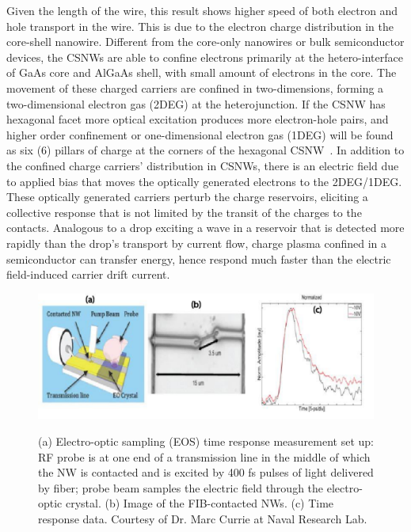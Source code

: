 Given the length of the wire, this result shows higher speed of both electron
and hole transport in the wire. This is due to the electron charge distribution
in the core-shell nanowire. Different from the core-only nanowires or bulk
semiconductor devices, the CSNWs are able to confine electrons primarily at the
hetero-interface of GaAs core and AlGaAs shell, with small amount of electrons
in the core. The movement of these charged carriers are confined in
two-dimensions, forming a two-dimensional electron gas (2DEG) at the
heterojunction. If the CSNW has hexagonal facet more optical excitation
produces more electron-hole pairs, and higher order confinement or
one-dimensional electron gas (1DEG) will be found as six (6) pillars of charge
at the corners of the hexagonal CSNW~\cite{Wang:2015hz}. In addition to the
confined charge carriers' distribution in CSNWs, there is an electric field due
to applied bias that moves the optically generated electrons to the 2DEG/1DEG.
These optically generated carriers perturb the charge reservoirs, eliciting a
collective response that is not limited by the transit of the charges to the
contacts. Analogous to a drop exciting a wave in a reservoir that is detected
more rapidly than the drop's transport by current flow, charge plasma confined
in a semiconductor can transfer energy, hence respond much faster than the
electric field-induced carrier drift current.

\begin{figure}
  \caption[Electro-optic sampling (EOS) time response measurement set up and results.]{(a) Electro-optic sampling (EOS) time response measurement set up: RF probe is at one end of a transmission line in the middle of which the NW is contacted and is excited by 400 fs pulses of light delivered by fiber; probe beam samples the electric field through the electro-optic crystal. (b) Image of the FIB-contacted NWs. (c) Time response data. Courtesy of Dr. Marc Currie at Naval Research Lab.}
  \centering
  \includegraphics[width=\textwidth]{pictures/Data/NWEOS}
  \label{NWEOS}
\end{figure}

